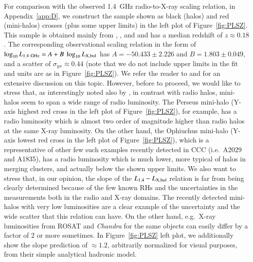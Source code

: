 \documentclass[traditabstract]{aa}
\newcommand{\rmn}{\mathrm}
\begin{document}
For comparison with the observed 1.4~GHz radio-to-X-ray scaling relation, in Appendix~\ref{app:D}, we construct the sample shown as black (halos) and red (mini-halos) crosses (plus some upper limits) in the left plot of Figure~\ref{fig:PLSZ}. This sample is obtained mainly from \cite{2009A&A...507..661B}, \cite{2011A&A...527A..99E},  and \cite{2009A&A...499..371G} and has a median redshift of $z\approx0.18$. The corresponding observational scaling relation in the form of $\log_{10} L_{1.4~\rmn{GHz}} = A + B~\log_{10} L_{\rm{X,bol}}$ has $A=-50.433\pm2.226$ and $B=1.803\pm0.049$, and a scatter of $\sigma_{yx} \approx 0.44$ (note that we do not include upper limits in the fit and units are as in Figure~\ref{fig:PLSZ}). We refer the reader to \cite{2009A&A...507..661B} and \cite{2011A&A...527A..99E} for an extensive discussion on this topic. However, before to proceed, we would like to stress that, as interestingly noted also by \cite{2009A&A...499..679M}, in contrast with radio halos, mini-halos seem to span a wide range of radio luminosity. The Perseus mini-halo (Y-axis highest red cross in the left plot of Figure~\ref{fig:PLSZ}), for example, has a radio luminosity which is almost two order of magnitude higher than radio halos at the same X-ray luminosity. On the other hand, the Ophiuchus mini-halo (Y-axis lowest red cross in the left plot of Figure~\ref{fig:PLSZ}), which is a representative of other few such examples recently detected in CCC (i.e.~A2029 and A1835), has a radio luminosity which is much lower, more typical of halos in merging clusters, and actually below the shown upper limits. We also want to stress that, in our opinion, the slope of the $L_{1.4}-L_{\rm{X,bol}}$ relation is far from being clearly determined because of the few known RHs and the uncertainties in the measurements both in the radio  and X-ray domains. The recently detected mini-halos with very low luminosities are a clear example of the uncertainty and the wide scatter that this relation can have. On the other hand, e.g.~X-ray luminosities from ROSAT and \emph{Chandra} for the same objects can easily differ by a factor of 2 or more sometimes. In Figure~\ref{fig:PLSZ} left plot, we additionally show the \cite{2009JCAP...09..024K} slope prediction of $\approx1.2$, arbitrarily normalized for visual purposes, from their simple analytical hadronic model.
\end{document}
